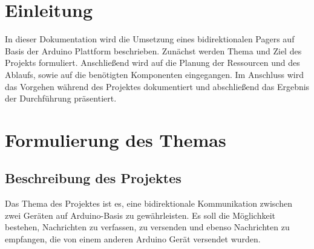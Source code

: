 \documentclass[a4paper, 11pt]{scrartcl}
\begin{document}
\newpage
\thispagestyle{empty}
\tableofcontents
\newpage
\clearpage
{}
\section{Einleitung}
In dieser Dokumentation wird die Umsetzung eines bidirektionalen Pagers auf Basis der Arduino Plattform beschrieben. Zunächst werden Thema und Ziel des Projekts formuliert.
Anschließend wird auf die Planung der Ressourcen und des Ablaufs, sowie auf die benötigten Komponenten eingegangen. Im Anschluss wird das Vorgehen während des Projektes dokumentiert
und abschließend das Ergebnis der Durchführung präsentiert.

\section{Formulierung des Themas}
\subsection{Beschreibung des Projektes}
Das Thema des Projektes ist es, eine bidirektionale Kommunikation zwischen zwei Geräten auf Arduino-Basis zu gewährleisten. Es soll die Möglichkeit bestehen,
Nachrichten zu verfassen, zu versenden und ebenso Nachrichten zu empfangen, die von einem anderen Arduino Gerät versendet wurden.
\end{document}
